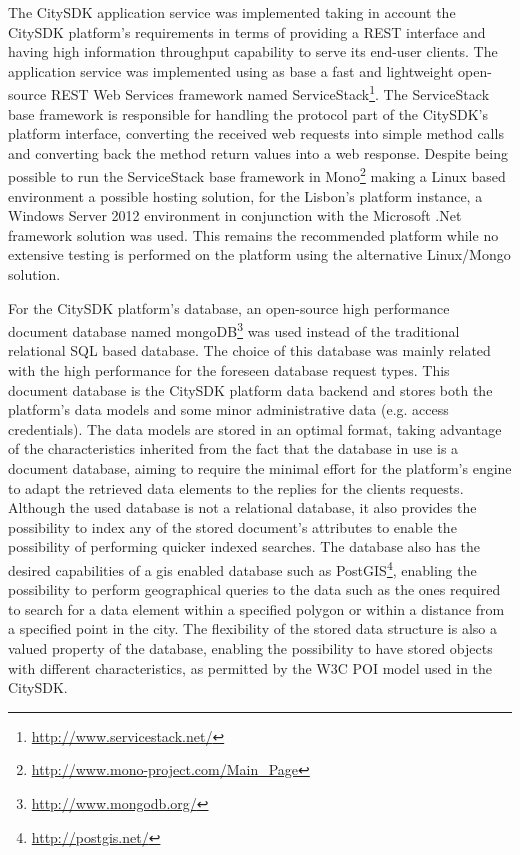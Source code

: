 \documentclass[times,doublespace]{ettauth}%
\begin{document}
The CitySDK application service was implemented taking in account the CitySDK platform's requirements in terms of providing a REST interface and having high information throughput capability to serve its end-user clients. 
The application service was implemented using as base a fast and lightweight open-source REST Web Services framework named ServiceStack\footnote{\url{http://www.servicestack.net/}}. The ServiceStack base framework is responsible for handling the protocol part of the CitySDK's platform interface, converting the received web requests into simple method calls and converting back the method return values into a web response. 
Despite being possible to run the ServiceStack base framework in Mono\footnote{\url{http://www.mono-project.com/Main_Page}} making a Linux based environment a possible hosting solution, for the Lisbon's platform instance, a Windows Server 2012 environment in conjunction with the Microsoft .Net framework solution was used.
This remains the recommended platform while no extensive testing is performed on the platform using the alternative Linux/Mongo solution.

For the CitySDK platform's database, an open-source high performance document database named mongoDB\footnote{\url{http://www.mongodb.org/}} was used instead of the traditional relational SQL based database. 
The choice of this database was mainly related with the high performance for the foreseen database request types. 
This document database is the CitySDK platform data backend and stores both the platform's data models and some minor administrative data (e.g. access credentials). 
The data models are stored in an optimal format, taking advantage of the characteristics inherited from the fact that the database in use is a document database, aiming to require the minimal effort for the platform's engine to adapt the retrieved data elements to the replies for the clients requests. 
Although the used database is not a relational database, it also provides the possibility to index any of the stored document's attributes to enable the possibility of performing quicker indexed searches. 
The database also has the desired capabilities of a \ac{gis} enabled database such as PostGIS\footnote{\url{http://postgis.net/}}, enabling the possibility to perform geographical queries to the data such as the ones required to search for a data element within a specified polygon or within a distance from a specified point in the city. 
The flexibility of the stored data structure is also a valued property of the database, enabling the possibility to have stored objects with different characteristics, as permitted by the W3C POI model used in the CitySDK.
\end{document}
